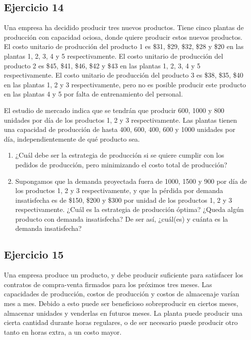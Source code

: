 \documentclass[12pt]{article}
\begin{document}
\subsection{Ejercicio 14}

Una empresa ha decidido producir tres nuevos productos. Tiene cinco plantas de producción con capacidad ociosa, donde quiere producir estos nuevos productos. El costo unitario de producción del producto 1 es \$31, \$29, \$32, \$28 y \$20 en las plantas 1, 2, 3, 4 y 5 respectivamente. El costo unitario de producción del producto 2 es \$45, \$41, \$46, \$42 y \$43 en las plantas 1, 2, 3, 4 y 5 respectivamente. El costo unitario de producción del producto 3 es \$38, \$35, \$40 en las plantas 1, 2 y 3 respectivamente, pero no es posible producir este producto en las plantas 4 y 5 por falta de entrenamiento del personal.

El estudio de mercado indica que se tendrán que producir 600, 1000 y 800 unidades por día de los productos 1, 2 y 3 respectivamente. Las plantas tienen una capacidad de producción de hasta 400, 600, 400, 600 y 1000 unidades por día, independientemente de qué producto sea.

\begin{enumerate}
\item ¿Cuál debe ser la estrategia de producción si se quiere cumplir con los pedidos de producción, pero minimizando el costo total de producción?
\item Supongamos que la demanda proyectada fuera de 1000, 1500 y 900 por día de los productos 1, 2 y 3 respectivamente, y que la pérdida por demanda insatisfecha es de \$150, \$200 y \$300 por unidad de los productos 1, 2 y 3 respectivamente. ¿Cuál es la estrategia de producción óptima? ¿Queda algún producto con demanda insatisfecha? De ser así, ¿cuál(es) y cuánta es la demanda insatisfecha?
\end{enumerate}

\subsection{Ejercicio 15}

Una empresa produce un producto, y debe producir suficiente para satisfacer los contratos de compra-venta firmados para los próximos tres meses. Las capacidades de producción, costos de producción y costos de almacenaje varían mes a mes. Debido a esto puede ser beneficioso sobreproducir en ciertos meses, almacenar unidades y venderlas en futuros meses. La planta puede producir una cierta cantidad durante horas regulares, o de ser necesario puede producir otro tanto en horas extra, a un costo mayor.
\end{document}
